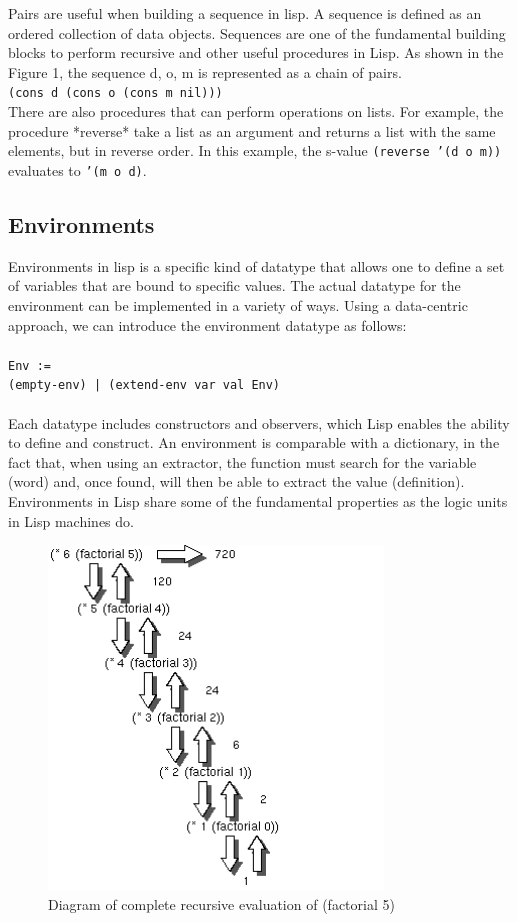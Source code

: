 \documentclass[journal]{IEEEtran}
\begin{document}
Pairs are useful when building a sequence in lisp. A sequence is defined as an ordered collection of data objects. Sequences are one of the fundamental building blocks to perform recursive and other useful procedures in Lisp. As shown in the Figure 1, the sequence d, o, m is represented as a chain of pairs.\\



\texttt{(cons d (cons o (cons m nil)))}\\

There are also procedures that can perform operations on lists. For example, the procedure *reverse* take a list as an argument and returns a list with the same elements, but in reverse order. In this example, the s-value \texttt{(reverse '(d o m))} evaluates to \texttt{'(m o d)}.


\subsection{Environments}
Environments in lisp is a specific kind of datatype that allows one to define a set of variables that are bound to specific values. The actual datatype for the environment can be implemented in a variety of ways. Using a data-centric approach, we can introduce the environment datatype as follows:\\\\
\texttt{Env :=}\\\texttt{(empty-env) | (extend-env var val Env)}\\\\Each datatype includes constructors and observers, which Lisp enables the ability to define and construct. An environment is comparable with a dictionary, in the fact that, when using an extractor, the function must search for the variable (word) and, once found, will then be able to extract the value (definition). Environments in Lisp share some of the fundamental properties as the logic units in Lisp machines do.

\begin{figure}[!t]
	\centering
	\includegraphics[width=3.5in]{factorial}
	\caption{Diagram of complete recursive evaluation of (factorial 5)}
	\label{Factorial}
\end{figure}
\end{document}
